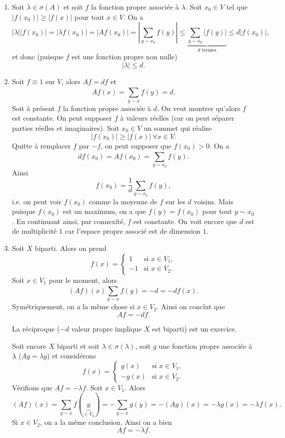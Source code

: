 \begin{preuve}
  \begin{enumerate}
  \item Soit $\lambda \in \sigma(A)$ et soit $f$ la fonction propre associée à $\lambda$. Soit $x_0 \in V$ tel
    que $|f(x_0)| \geq |f(x)|$ pour tout $x \in V$. On a 
    \[ |\lambda||f(x_0)| = |\lambda f(x_0)| = |Af(x_0)| = \left| \sum_{y \sim x_0}^{}f(y) \right| \leq
      \underbrace{\sum_{y\sim x_0}^{}|f(y)|}_{d \text{ termes}} \leq d|f(x_0)|,\]
    et donc (puisque $f$ est une fonction propre non nulle)
    \[ |\lambda| \leq d. \]

    
  \item Soit $f \equiv 1$ sur $V$, alors $Af = df$ et 
    \[ Af(x) = \sum_{y \sim x}^{} f(y) = d. \]
    Soit à présent $f$ la fonction propre associée à $d$. On veut montrer qu'alors $f$ est constante. On peut
    supposer $f$ à valeurs réelles (car on peut séparer parties réelles et imaginaires). Soit $x_0 \in V$ un sommet qui réalise 
    \[ |f(x_0)| \geq |f(x)|\ \forall x \in V. \]
    Quitte à remplacer $f$ par $-f$, on peut supposer que $f(x_0) > 0$. On a 
    \[ df(x_0) = Af(x_0) = \sum_{y \sim x_0}^{} f(y).  \]
    Ainsi 
    \[ f(x_0) = \frac{1}{d} \sum_{y \sim x_0}^{}f(y), \]
    i.e. on peut voir $f(x_0)$ comme la moyenne de $f$ sur les $d$ voisins. Mais puisque $f(x_0)$ est un
    maximum, on a que $f(y) = f(x_0)$ pour tout $y \sim x_0$. En continuant ainsi, par connexité, $f$ est
    constante. On voit encore que $d$ est de multiplicité $1$ car l'espace propre associé est de dimension $1$.

  \item Soit $X$ biparti. Alors on prend 
    \[ f(x) =
      \begin{cases}
        1 & \text{si } x \in V_1,\\
        -1 & \text{si } x \in V_2.
      \end{cases}
    \]
    Soit $x \in V_1$ pour le moment, alors
    \[ (Af)(x) \sum_{y \sim x}^{} f(y) = -d = -df(x).\]
    Symétriquement, on a la même chose si $x \in V_2$. Ainsi on conclut que 
    \[ Af = -df. \]

    La réciproque ($-d$ valeur propre implique $X$ est biparti) est un exercice.

    Soit encore $X$ biparti et soit $\lambda \in \sigma(\lambda)$, soit $g$ une fonction propre associée à
    $\lambda$ ($Ag = \lambda g$) et considérons 
    \[ f(x) = \begin{cases}
        g(x) & \text{si } x \in V_1,\\
        -g(x)& \text{si } x \in V_2.
      \end{cases} \]
    Vérifions que $Af = -\lambda f$. Soit $x \in V_1$. Alors 
    \[ (Af)(x) = \sum_{y \sim x}^{} f(\underbrace{y}_{\in V_2}) = -\sum_{y \sim x}^{} g(y) = -(Ag)(x) =
      -\lambda g(x) = -\lambda f(x).\]
    Si $x \in V_2$, on a la même conclusion. Ainsi on a bien 
    \[ Af = -\lambda f. \]
  \end{enumerate}
\end{preuve}


